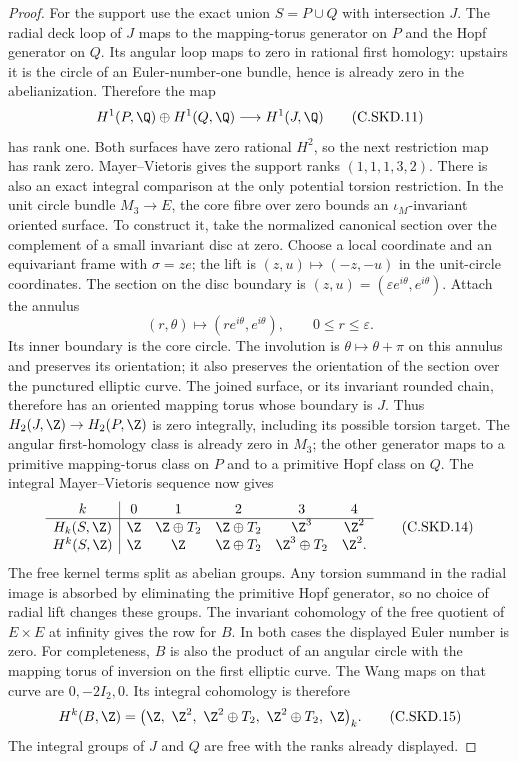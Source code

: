 \begin{proof}
For the support use the exact union
$S=P\cup Q$ with intersection $J$. The
radial deck loop of $J$ maps to the
mapping-torus generator on $P$ and the
Hopf generator on $Q$. Its angular loop
maps to zero in rational first homology:
upstairs it is the circle of an
Euler-number-one bundle, hence is already
zero in the abelianization. Therefore
the map
\[
           H^1(P,\Q)\oplus H^1(Q,\Q)
                         \longrightarrow H^1(J,\Q)
                                                            \tag{C.SKD.11}
\]
has rank one. Both surfaces have zero
rational $H^2$, so the next restriction
map has rank zero. Mayer--Vietoris gives
the support ranks $(1,1,1,3,2)$.
There is also an exact integral comparison at the only
potential torsion restriction. In the unit circle bundle
$M_3\to E$, the core fibre over zero bounds an
$\iota_M$-invariant oriented surface. To construct it,
take the normalized canonical section over the complement
of a small invariant disc at zero. Choose a local
coordinate and an equivariant frame with
$\sigma=z e$; the lift is
$(z,u)\mapsto(-z,-u)$ in the unit-circle coordinates.
The section on the disc boundary is
$(z,u)=(\varepsilon e^{i\theta},e^{i\theta})$.
Attach the annulus
\[
 (r,\theta)\longmapsto(re^{i\theta},e^{i\theta}),
                 \qquad 0\le r\le\varepsilon .
\]
Its inner boundary is the core circle. The involution
is $\theta\mapsto\theta+\pi$ on this annulus and
preserves its orientation; it also preserves the
orientation of the section over the punctured elliptic
curve. The joined surface, or its invariant rounded
chain, therefore has an oriented mapping torus whose
boundary is $J$. Thus
$H_2(J,\Z)\to H_2(P,\Z)$ is zero integrally,
including its possible torsion target. The angular
first-homology class is already zero in $M_3$;
the other generator maps to a primitive mapping-torus
class on $P$ and to a primitive Hopf class on $Q$.
The integral Mayer--Vietoris sequence now gives
\[
 \begin{array}{c|ccccc}
 k&0&1&2&3&4\\ \hline
 H_k(S,\Z)&
 \Z&\Z\oplus T_2&\Z\oplus T_2&\Z^3&\Z^2\\
 H^k(S,\Z)&
 \Z&\Z&\Z\oplus T_2&\Z^3\oplus T_2&\Z^2 .
 \end{array}                                             \tag{C.SKD.14}
\]
The free kernel terms split as abelian groups.
Any torsion summand in the radial image is absorbed
by eliminating the primitive Hopf generator, so
no choice of radial lift changes these groups.
The invariant cohomology of the free
quotient of $E\times E$ at infinity
gives the row for $B$. In both cases
the displayed Euler number is zero.
For completeness, $B$ is also the product of an
angular circle with the mapping torus of inversion
on the first elliptic curve. The Wang maps on
that curve are $0,-2I_2,0$. Its integral
cohomology is therefore
\[
 H^k(B,\Z)=
 \bigl(\Z,\ \Z^2,\ \Z^2\oplus T_2,\
                  \Z^2\oplus T_2,\ \Z\bigr)_k .
                                                            \tag{C.SKD.15}
\]
The integral groups of $J$ and $Q$ are free with
the ranks already displayed.


\end{proof}
